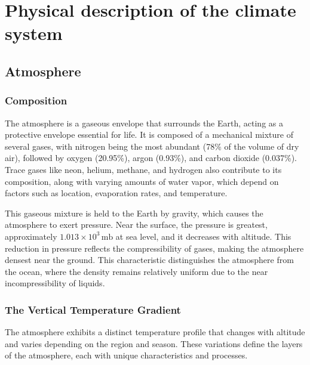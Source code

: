 
\chapter{Physical description of the climate system}\label{chapter1}

\section{Atmosphere}
\subsection*{Composition}

The atmosphere is a gaseous envelope that surrounds the Earth, acting as a protective envelope essential for life. It is composed of a mechanical mixture of several gases, with nitrogen being the most abundant (78\% of the volume of dry air), followed by oxygen (20.95\%), argon (0.93\%), and carbon dioxide (0.037\%). Trace gases like neon, helium, methane, and hydrogen also contribute to its composition, along with varying amounts of water vapor, which depend on factors such as location, evaporation rates, and temperature.

This gaseous mixture is held to the Earth by gravity, which causes the atmosphere to exert pressure. Near the surface, the pressure is greatest, approximately $1.013 \times 10^3 \, \mathrm{mb}$ at sea level, and it decreases with altitude. This reduction in pressure reflects the compressibility of gases, making the atmosphere densest near the ground. This characteristic distinguishes the atmosphere from the ocean, where the density remains relatively uniform due to the near incompressibility of liquids.

\subsection*{The Vertical Temperature Gradient}

The atmosphere exhibits a distinct temperature profile that changes with altitude and varies depending on the region and season. These variations define the layers of the atmosphere, each with unique characteristics and processes.

